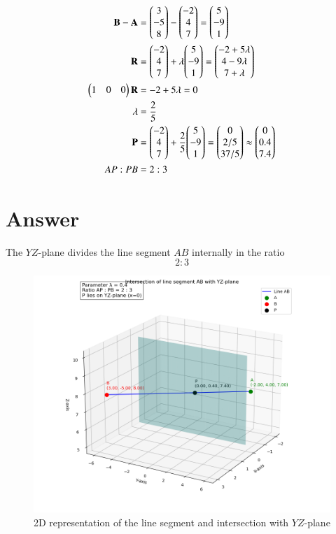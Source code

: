 \documentclass[journal]{IEEEtran}
\begin{document}
\begin{align}
\mathbf{B}-\mathbf{A} &= \mathbf{\begin{pmatrix}3\\-5\\8\end{pmatrix}-\begin{pmatrix}-2\\4\\7\end{pmatrix}} = \mathbf{\begin{pmatrix}5\\-9\\1\end{pmatrix}} \label{eq:B_minus_A} \\
\mathbf{R} &= \mathbf{\begin{pmatrix}-2\\4\\7\end{pmatrix}} + \lambda \mathbf{\begin{pmatrix}5\\-9\\1\end{pmatrix}} = \mathbf{\begin{pmatrix}-2 + 5\lambda\\ 4 - 9\lambda\\ 7 + \lambda\end{pmatrix}} \label{eq:R_numeric} \\
\begin{pmatrix}1 & 0 & 0\end{pmatrix} \mathbf{R} &= -2 + 5\lambda = 0 \label{eq:solve_lambda} \\
\lambda &= \frac{2}{5} \label{eq:lambda_final} \\
\mathbf{P} &= \mathbf{\begin{pmatrix}-2\\4\\7\end{pmatrix}} + \frac{2}{5}\mathbf{\begin{pmatrix}5\\-9\\1\end{pmatrix}} = \mathbf{\begin{pmatrix}0\\ 2/5 \\ 37/5\end{pmatrix}} \approx \mathbf{\begin{pmatrix}0\\0.4\\7.4\end{pmatrix}} \label{eq:P_numeric} \\
AP : PB &= 2 : 3 \label{eq:final_ratio}
\end{align}

\section*{Answer}

The $YZ$-plane divides the line segment $AB$ internally in the ratio
$$
\boxed{2:3}
$$

\begin{figure}[h]
    \centering
    \includegraphics[width=0.9\columnwidth]{figs/fig_61.png}
    \caption{2D representation of the line segment and intersection with $YZ$-plane}
    \label{fig:fig1}
\end{figure}
\end{document}
